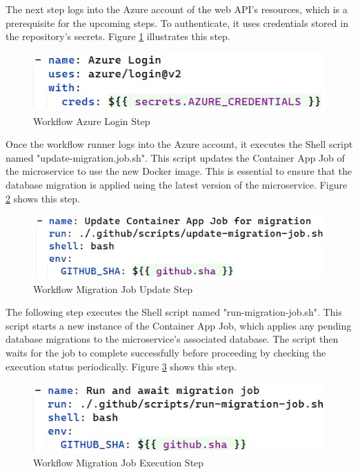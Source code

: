 \documentclass[12pt, reqno, oneside]{amsbook}
\theoremstyle{definition}
\theoremstyle{definition}
\numberwithin{section}{chapter}
\numberwithin{table}{chapter}
\numberwithin{figure}{chapter}
\begin{document}
The next step logs into the Azure account of the web \ac{API}'s resources, which is a prerequisite for the upcoming steps. To authenticate, it uses credentials stored in the repository's secrets. Figure \ref{Figure:GithubWorkflowAzureLogin} illustrates this step.

\begin{figure}[H]
  \centering
  \includegraphics[width=0.7\linewidth]{images/GithubWorkflowAzureLogin.png}
  \caption{\label{Figure:GithubWorkflowAzureLogin}Workflow Azure Login Step}
\end{figure}

Once the workflow runner logs into the Azure account, it executes the Shell script named "update-migration.job.sh". This script updates the Container App Job of the microservice to use the new Docker image. This is essential to ensure that the database migration is applied using the latest version of the microservice. Figure \ref{Figure:GithubWorkflowMigrationJobUpdate} shows this step.

\begin{figure}[H]
  \centering
  \includegraphics[width=0.7\linewidth]{images/GithubWorkflowMigrationJobUpdate.png}
  \caption{\label{Figure:GithubWorkflowMigrationJobUpdate}Workflow Migration Job Update Step}
\end{figure}

The following step executes the Shell script named "run-migration-job.sh". This script starts a new instance of the Container App Job, which applies any pending database migrations to the microservice's associated database. The script then waits for the job to complete successfully before proceeding by checking the execution status periodically. Figure \ref{Figure:GithubWorkflowMigrationJobExecution} shows this step.

\begin{figure}[H]
  \centering
  \includegraphics[width=0.7\linewidth]{images/GithubWorkflowMigrationJobExecution.png}
  \caption{\label{Figure:GithubWorkflowMigrationJobExecution}Workflow Migration Job Execution Step}
\end{figure}
\end{document}
